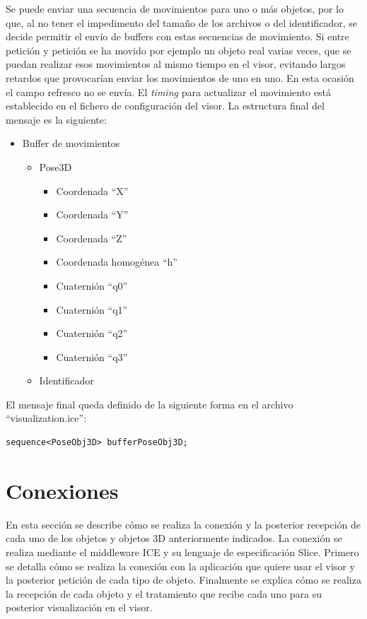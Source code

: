 Se puede enviar una secuencia de movimientos para uno o más objetos, por lo que, al no tener el impedimento del tamaño de los archivos o del identificador, se decide permitir el envío de buffers con estas secuencias de movimiento. Si entre petición y petición se ha movido por ejemplo un objeto real varias veces, que se puedan realizar esos movimientos al mismo tiempo en el visor, evitando largos retardos que provocarían enviar los movimientos de uno en uno. En esta ocasión el campo refresco no se envía. El \textit{timing} para actualizar el movimiento está establecido en el fichero de configuración del visor.
La estructura final del mensaje es la siguiente:
\begin{itemize}
	\item Buffer de movimientos
	\begin{itemize}
		\item	Pose3D
		\begin{itemize}
			\item Coordenada ``X''
			\item Coordenada ``Y''
			\item Coordenada ``Z''
			\item Coordenada homogénea ``h''
			\item Cuaternión ``q0''
			\item Cuaternión ``q1''
			\item Cuaternión ``q2''
			\item Cuaternión ``q3''
		\end{itemize}
		\item Identificador
	\end{itemize}
\end{itemize}

El mensaje final queda definido de la siguiente forma en el archivo ``visualization.ice'':

\begin{lstlisting}[caption= Definición del buffer de movimientos con Slice, label=cod.buffermovslice]
sequence<PoseObj3D> bufferPoseObj3D;
\end{lstlisting}

\section{Conexiones}
En esta sección se describe cómo se realiza la conexión y la posterior recepción de cada uno de los objetos y objetos 3D anteriormente indicados. La conexión se realiza mediante el middleware ICE y su lenguaje de especificación Slice. Primero se detalla cómo se realiza la conexión con la aplicación que quiere usar el visor y la posterior petición de cada tipo de objeto. Finalmente se explica cómo se realiza la recepción de cada objeto y el tratamiento que recibe cada uno para su posterior visualización en el visor.

